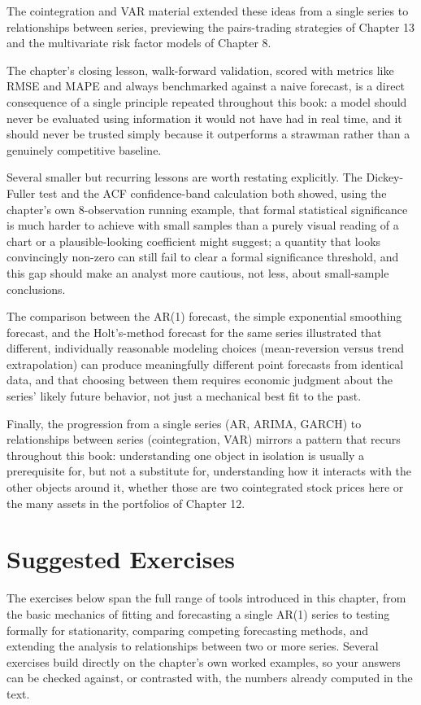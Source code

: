 \documentclass[../ai_in_finance]{subfiles}
\begin{document}
The cointegration and VAR material extended these ideas from a single series to relationships between series, previewing the pairs-trading strategies of Chapter 13 and the multivariate risk factor models of Chapter 8.

The chapter's closing lesson, walk-forward validation, scored with metrics like RMSE and MAPE and always benchmarked against a naive forecast, is a direct consequence of a single principle repeated throughout this book: a model should never be evaluated using information it would not have had in real time, and it should never be trusted simply because it outperforms a strawman rather than a genuinely competitive baseline.

Several smaller but recurring lessons are worth restating explicitly. The Dickey-Fuller test and the ACF confidence-band calculation both showed, using the chapter's own 8-observation running example, that formal statistical significance is much harder to achieve with small samples than a purely visual reading of a chart or a plausible-looking coefficient might suggest; a quantity that looks convincingly non-zero can still fail to clear a formal significance threshold, and this gap should make an analyst more cautious, not less, about small-sample conclusions.

The comparison between the AR(1) forecast, the simple exponential smoothing forecast, and the Holt's-method forecast for the same series illustrated that different, individually reasonable modeling choices (mean-reversion versus trend extrapolation) can produce meaningfully different point forecasts from identical data, and that choosing between them requires economic judgment about the series' likely future behavior, not just a mechanical best fit to the past.

Finally, the progression from a single series (AR, ARIMA, GARCH) to relationships between series (cointegration, VAR) mirrors a pattern that recurs throughout this book: understanding one object in isolation is usually a prerequisite for, but not a substitute for, understanding how it interacts with the other objects around it, whether those are two cointegrated stock prices here or the many assets in the portfolios of Chapter 12.

\section{Suggested Exercises}

The exercises below span the full range of tools introduced in this chapter, from the basic mechanics of fitting and forecasting a single AR(1) series to testing formally for stationarity, comparing competing forecasting methods, and extending the analysis to relationships between two or more series. Several exercises build directly on the chapter's own worked examples, so your answers can be checked against, or contrasted with, the numbers already computed in the text.
\end{document}
